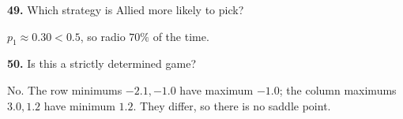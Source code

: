 \documentclass[12pt]{ximera}
\begin{document}
\begin{problem}
\begin{prompt}
\textbf{49.} Which strategy is Allied more likely to pick?
\begin{multipleChoice}
\end{multipleChoice}
\begin{feedback}
$p_1\approx0.30<0.5$, so radio $70\%$ of the time.
\end{feedback}
\end{prompt}

\begin{prompt}
\textbf{50.} Is this a strictly determined game?
\begin{multipleChoice}
\end{multipleChoice}
\begin{feedback}
No. The row minimums $-2.1,-1.0$ have maximum $-1.0$; the column maximums $3.0,1.2$ have minimum $1.2$. They differ, so there is no saddle point.
\end{feedback}
\end{prompt}
\end{problem}
\end{document}
